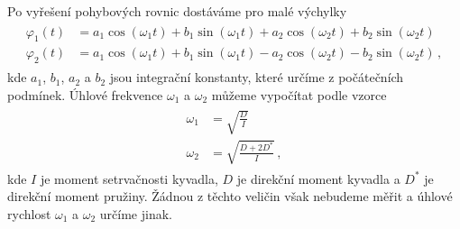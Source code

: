 Po vyřešení pohybových rovnic dostáváme pro malé výchylky \cite{ZFP}
\begin{align}
\label{eq::phiobecne}
\begin{split}
 \varphi _1(t) &= a_1 \cos (\omega _1 t) + b_1 \sin (\omega _1 t) + a_2 \cos (\omega_2 t) + b_2 \sin(\omega_2 t)
\\
 \varphi _2(t) &= a_1 \cos (\omega _1 t) + b_1 \sin (\omega _1 t) - a_2 \cos (\omega_2 t) - b_2 \sin(\omega_2 t) \,,
\end{split}
\end{align}
kde $a_1$, $b_1$, $a_2$ a $b_2$ jsou integrační konstanty, které určíme z počátečních podmínek.
Úhlové frekvence $\omega _1$ a $\omega _2$ můžeme vypočítat podle vzorce \cite{ZFP}
\begin{align}
\label{eq::omegadirekcni}
\begin{split}
 \omega_1 &= \sqrt{\frac{D}{I}}
\\
 \omega_2 &= \sqrt{\frac{D+2D^{\ast}}{I}} \,,
\end{split}
\end{align}
kde $I$ je moment setrvačnosti kyvadla, $D$ je direkční moment kyvadla a $D^{\ast}$ je direkční moment pružiny. Žádnou z těchto veličin však nebudeme měřit a úhlové rychlost $\omega _1$ a $\omega _2$ určíme jinak.


